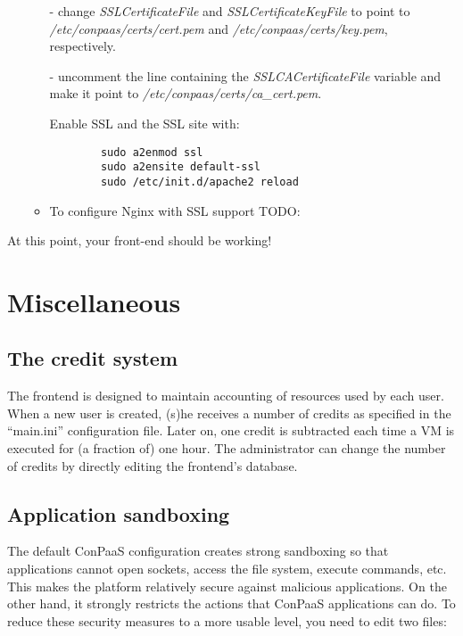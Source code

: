 \documentclass[10pt]{article}
\begin{document}
\begin{enumerate}[resume]
\begin{itemize}
      - change \textit{SSLCertificateFile} and \textit{SSLCertificateKeyFile} to point to
      \textit{/etc/conpaas/certs/cert.pem} and \textit{/etc/conpaas/certs/key.pem}, respectively.
      
      - uncomment the line containing the \textit{SSLCACertificateFile} variable and make it point
      to \textit{/etc/conpaas/certs/ca\_cert.pem}.

      Enable SSL and the SSL site with:
      \begin{verbatim}
        sudo a2enmod ssl
        sudo a2ensite default-ssl
        sudo /etc/init.d/apache2 reload
      \end{verbatim}

    \item To configure Nginx with SSL support
      TODO:
  \end{itemize}
\end{enumerate}

At this point, your front-end should be working!

\section{Miscellaneous}
\label{sec:misc}

\subsection{The credit system}

The frontend is designed to maintain accounting of resources used by
each user. When a new user is created, (s)he receives a number of
credits as specified in the ``main.ini'' configuration file. Later on,
one credit is subtracted each time a VM is executed for (a fraction
of) one hour. The administrator can change the number of credits by
directly editing the frontend's database. 

\subsection{Application sandboxing}

The default ConPaaS configuration creates strong sandboxing so that
applications cannot open sockets, access the file system, execute
commands, etc. This makes the platform relatively secure against
malicious applications. On the other hand, it strongly restricts the
actions that ConPaaS applications can do. To reduce these security
measures to a more usable level, you need to edit two files:
\end{document}
